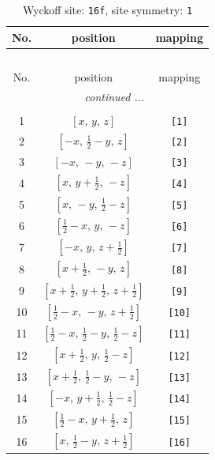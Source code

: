 \documentclass[fleqn,8pt]{jsarticle}
\begin{document}
\begin{longtable}{ccc}
\caption{Wyckoff site: {\tt 16f}, site symmetry: {\tt 1}}
 \\
 \hline \hline
No. & position & mapping \\ \hline \endfirsthead

\multicolumn{2}{l}{\tablename\ \thetable{}} \\
 \hline \hline
No. & position & mapping \\ \hline \endhead

 \hline \hline
\multicolumn{2}{r}{\footnotesize\it continued ...} \\ \endfoot

 \hline \hline
\multicolumn{2}{r}{} \\ \endlastfoot

1 & $\left[ x,\, y,\, z \right]$ & {\tt [1]} \\ \hline
2 & $\left[ - x,\, \frac{1}{2} - y,\, z \right]$ & {\tt [2]} \\ \hline
3 & $\left[ - x,\, - y,\, - z \right]$ & {\tt [3]} \\ \hline
4 & $\left[ x,\, y + \frac{1}{2},\, - z \right]$ & {\tt [4]} \\ \hline
5 & $\left[ x,\, - y,\, \frac{1}{2} - z \right]$ & {\tt [5]} \\ \hline
6 & $\left[ \frac{1}{2} - x,\, y,\, - z \right]$ & {\tt [6]} \\ \hline
7 & $\left[ - x,\, y,\, z + \frac{1}{2} \right]$ & {\tt [7]} \\ \hline
8 & $\left[ x + \frac{1}{2},\, - y,\, z \right]$ & {\tt [8]} \\ \hline
9 & $\left[ x + \frac{1}{2},\, y + \frac{1}{2},\, z + \frac{1}{2} \right]$ & {\tt [9]} \\ \hline
10 & $\left[ \frac{1}{2} - x,\, - y,\, z + \frac{1}{2} \right]$ & {\tt [10]} \\ \hline
11 & $\left[ \frac{1}{2} - x,\, \frac{1}{2} - y,\, \frac{1}{2} - z \right]$ & {\tt [11]} \\ \hline
12 & $\left[ x + \frac{1}{2},\, y,\, \frac{1}{2} - z \right]$ & {\tt [12]} \\ \hline
13 & $\left[ x + \frac{1}{2},\, \frac{1}{2} - y,\, - z \right]$ & {\tt [13]} \\ \hline
14 & $\left[ - x,\, y + \frac{1}{2},\, \frac{1}{2} - z \right]$ & {\tt [14]} \\ \hline
15 & $\left[ \frac{1}{2} - x,\, y + \frac{1}{2},\, z \right]$ & {\tt [15]} \\ \hline
16 & $\left[ x,\, \frac{1}{2} - y,\, z + \frac{1}{2} \right]$ & {\tt [16]} \\
\end{longtable}
\end{document}
